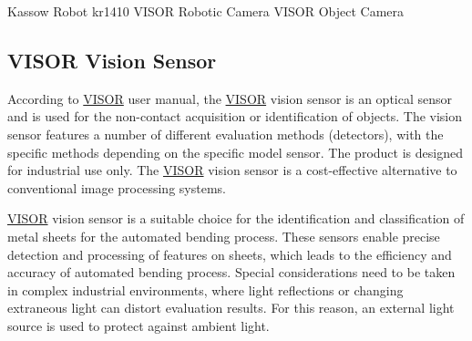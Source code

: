 Kassow Robot kr1410
VISOR Robotic Camera
VISOR Object Camera

\subsection{VISOR\textsuperscript{\textregistered} Vision Sensor}
\label{sec:visor_3}

According to \hyperref[acro:VISOR]{VISOR}\textsuperscript{\textregistered} \cite[page 22]{visor_user_manual} user manual, the \hyperref[acro:VISOR]{VISOR}\textsuperscript{\textregistered} vision sensor is an optical sensor and is used for the non-contact acquisition or identification of objects.
The vision sensor features a number of different evaluation methods (detectors), with the specific methods
depending on the specific model sensor. The product is designed for industrial use only. The \hyperref[acro:VISOR]{VISOR}\textsuperscript{\textregistered} vision sensor is a cost-effective alternative to conventional image processing systems.

\hyperref[acro:VISOR]{VISOR}\textsuperscript{\textregistered} vision sensor is a suitable choice for the identification and classification of metal sheets for the automated bending process.
These sensors enable precise detection and processing of features on sheets, which leads to the efficiency and accuracy of automated bending process.
Special considerations need to be taken in complex industrial environments, where light reflections or changing extraneous light can distort evaluation results. For this reason, an external light source is used to protect against ambient light.